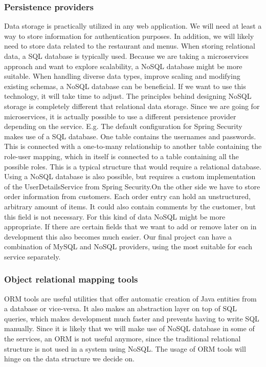 \documentclass[12pt]{article}
\begin{document}
\subsubsection{Persistence providers}
Data storage is practically utilized in any web application. We will need at least a way to store information for authentication purposes. In addition, we will likely need to store data related to the restaurant and menus. When storing relational data, a SQL database is typically used. Because we are taking a microservices approach and want to explore scalability, a NoSQL database might be more suitable.\cite{MongodbVsMySQL92:online} When handling diverse data types, improve scaling and modifying existing schemas, a NoSQL database can be beneficial. If we want to use this technology, it will take time to adjust. The principles behind designing NoSQL storage is completely different that relational data storage.
Since we are going for microservices, it is actually possible to use a different persistence provider depending on the service.
E.g. The default configuration for Spring Security makes use of a SQL database. One table contains the usernames and passwords. This is connected with a one-to-many relationship to another table containing the role-user mapping, which in itself is connected to a table containing all the possible roles. This is a typical structure that would require a relational database. Using a NoSQL database is also possible, but requires a custom implementation of the UserDetailsService from Spring Security.On the other side we have to store order information from customers. Each order entry can hold an unstructured, arbitrary amount of items. It could also contain comments by the customer, but this field is not necessary. For this kind of data NoSQL might be more appropriate. If there are certain fields that we want to add or remove later on in development this also becomes much easier. Our final project can have a combination of MySQL and NoSQL providers, using the most suitable for each service separately.
\subsubsection{Object relational mapping tools}
ORM tools are useful utilities that offer automatic creation of Java entities from a database or vice-versa. It also makes an abstraction layer on top of SQL queries, which makes development much faster and prevents having to write SQL manually. Since it is likely that we will make use of NoSQL database in some of the services, an ORM is not useful anymore, since the traditional relational structure is not used in a system using NoSQL. The usage of ORM tools will hinge on the data structure we decide on.
\end{document}
